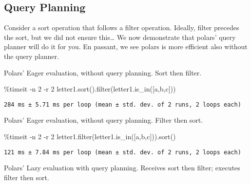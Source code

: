 \documentclass[
  letterpaper,
  DIV=11,
  numbers=noendperiod]{scrartcl}
\newenvironment{Shaded}{\begin{snugshade}}{\end{snugshade}}
\newcommand{\BuiltInTok}[1]{\textcolor[rgb]{0.00,0.23,0.31}{#1}}
\newcommand{\DecValTok}[1]{\textcolor[rgb]{0.68,0.00,0.00}{#1}}
\newcommand{\NormalTok}[1]{\textcolor[rgb]{0.00,0.23,0.31}{#1}}
\newcommand{\OperatorTok}[1]{\textcolor[rgb]{0.37,0.37,0.37}{#1}}
\newcommand{\StringTok}[1]{\textcolor[rgb]{0.13,0.47,0.30}{#1}}
\begin{document}
\hypertarget{query-planning}{%
\subsection{Query Planning}\label{query-planning}}

Consider a sort operation that follows a filter operation. Ideally,
filter precedes the sort, but we did not ensure this\ldots{} We now
demonstrate that polars' query planner will do it for you. En passant,
we see polars is more efficient also without the query planner.

Polars' Eager evaluation, without query planning. Sort then filter.

\begin{Shaded}
\begin{Highlighting}[]
\OperatorTok{\%}\NormalTok{timeit }\OperatorTok{{-}}\NormalTok{n }\DecValTok{2} \OperatorTok{{-}}\NormalTok{r }\DecValTok{2}\NormalTok{ letter1.sort().}\BuiltInTok{filter}\NormalTok{(letter1.is\_in([}\StringTok{\textquotesingle{}a\textquotesingle{}}\NormalTok{,}\StringTok{\textquotesingle{}b\textquotesingle{}}\NormalTok{,}\StringTok{\textquotesingle{}c\textquotesingle{}}\NormalTok{]))}
\end{Highlighting}
\end{Shaded}

\begin{verbatim}
284 ms ± 5.71 ms per loop (mean ± std. dev. of 2 runs, 2 loops each)
\end{verbatim}

Polars' Eager evaluation, without query planning. Filter then sort.

\begin{Shaded}
\begin{Highlighting}[]
\OperatorTok{\%}\NormalTok{timeit }\OperatorTok{{-}}\NormalTok{n }\DecValTok{2} \OperatorTok{{-}}\NormalTok{r }\DecValTok{2}\NormalTok{ letter1.}\BuiltInTok{filter}\NormalTok{(letter1.is\_in([}\StringTok{\textquotesingle{}a\textquotesingle{}}\NormalTok{,}\StringTok{\textquotesingle{}b\textquotesingle{}}\NormalTok{,}\StringTok{\textquotesingle{}c\textquotesingle{}}\NormalTok{])).sort()}
\end{Highlighting}
\end{Shaded}

\begin{verbatim}
121 ms ± 7.84 ms per loop (mean ± std. dev. of 2 runs, 2 loops each)
\end{verbatim}

Polars' Lazy evaluation with query planning. Receives sort then filter;
executes filter then sort.
\end{document}
